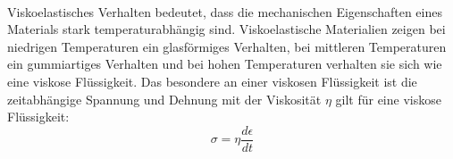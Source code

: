 \documentclass[11pt,a4paper]{article}
\numberwithin{equation}{section}
\numberwithin{figure}{section}
\begin{document}
\\
\begin{addmargin}[25pt]{0pt}
Viskoelastisches Verhalten bedeutet, dass die mechanischen Eigenschaften eines Materials stark temperaturabhängig sind. Viskoelastische Materialien zeigen bei niedrigen Temperaturen ein glasförmiges Verhalten, bei mittleren Temperaturen ein gummiartiges Verhalten und bei hohen Temperaturen verhalten sie sich wie eine viskose Flüssigkeit. Das besondere an einer viskosen Flüssigkeit ist die zeitabhängige Spannung und Dehnung mit der Viskosität $\eta$ gilt für eine viskose Flüssigkeit:
\begin{equation}\label{eq:viskose_Spannung}
    \sigma = \eta \frac{\si{d}\epsilon}{\si{d}t}
\end{equation}
\end{addmargin} 
\end{document}
